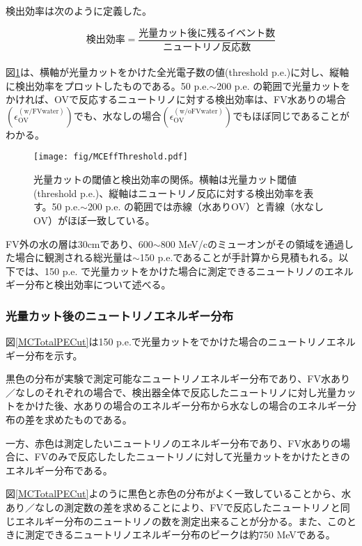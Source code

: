 \documentclass[11pt]{jreport}
\newcommand{\figref}[1]{図\ref{#1}}
\newcommand{\ov}{\mathrm{OV}}
\newcommand{\ww}{\mathrm{(w/ FVwater)}}
\newcommand{\wow}{\mathrm{(w/o FVwater)}}
\begin{document}
検出効率は次のように定義した。

\begin{equation}
\text{検出効率} = \frac{\text{光量カット後に残るイベント数}}{\text{ニュートリノ反応数}}
\end{equation}
\mbox{}\\

\figref{MCEffThreshold}は、横軸が光量カットをかけた全光電子数の値(threshold p.e.)に対し、縦軸に検出効率をプロットしたものである。50 p.e.$\sim$200 p.e. の範囲で光量カットをかければ、OVで反応するニュートリノに対する検出効率は、FV水ありの場合$\left(\epsilon_{\ov}^{\ww}\right)$でも、水なしの場合$\left(\epsilon_{\ov}^{\wow}\right)$でもほぼ同じであることがわかる。

\begin{figure}[htbp]
\centering
\texttt{[image: fig/MCEffThreshold.pdf]}
\caption[光量カットの閾値と検出効率の関係]{光量カットの閾値と検出効率の関係。横軸は光量カット閾値(threshold p.e.)、縦軸はニュートリノ反応に対する検出効率を表す。50 p.e.$\sim$200 p.e. の範囲では赤線（水ありOV）と青線（水なしOV）がほぼ一致している。}
\label{MCEffThreshold}
\end{figure}


FV外の水の層は30cmであり、600$\sim$800 MeV/cのミューオンがその領域を通過した場合に観測される総光量は$\sim$150 p.e.であることが手計算から見積もれる。以下では、150 p.e. で光量カットをかけた場合に測定できるニュートリノのエネルギー分布と検出効率について述べる。

\subsubsection{光量カット後のニュートリノエネルギー分布}

\figref{MCTotalPECut}は150 p.e.で光量カットをでかけた場合のニュートリノエネルギー分布を示す。

黒色の分布が実験で測定可能なニュートリノエネルギー分布であり、FV水あり／なしのそれぞれの場合で、検出器全体で反応したニュートリノに対し光量カットをかけた後、水ありの場合のエネルギー分布から水なしの場合のエネルギー分布の差を求めたものである。

一方、赤色は測定したいニュートリノのエネルギー分布であり、FV水ありの場合に、FVのみで反応したしたニュートリノに対して光量カットをかけたときのエネルギー分布である。

\figref{MCTotalPECut}よのうに黒色と赤色の分布がよく一致していることから、水あり／なしの測定数の差を求めることにより、FVで反応したニュートリノと同じエネルギー分布のニュートリノの数を測定出来ることが分かる。また、このときに測定できるニュートリノエネルギー分布のピークは約750 MeVである。
\end{document}

